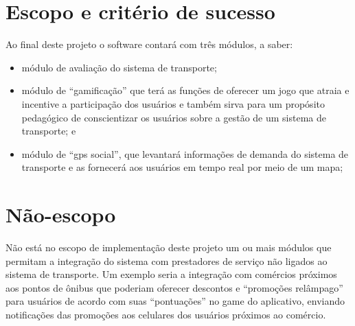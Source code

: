 \section{Escopo e critério de sucesso}\label{sec:Escopo}
	Ao final deste projeto o software contará com três módulos, a saber:
	\begin{itemize}%
		\item módulo de avaliação do sistema de transporte;
		\item módulo de “gamificação” que terá as funções de oferecer um jogo que atraia e incentive a participação dos usuários e também sirva para um propósito pedagógico de conscientizar os usuários sobre a gestão de um sistema de transporte; e
		\item módulo de ``gps social'', que levantará informações de demanda do sistema de transporte e as fornecerá aos usuários em tempo real por meio de um mapa;
	\end{itemize}

\section{Não-escopo}\label{sec:NãoEscopo}
	Não está no escopo de implementação deste projeto um ou mais módulos que permitam a integração do sistema com prestadores de serviço não ligados ao sistema de transporte. Um exemplo seria a integração com comércios próximos aos pontos de ônibus que poderiam oferecer descontos e ``promoções relâmpago'' para usuários de acordo com suas ``pontuações'' no game do aplicativo, enviando notificações das promoções aos celulares dos usuários próximos ao comércio.

